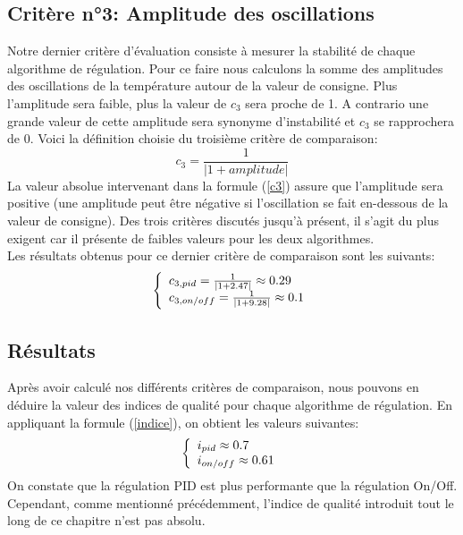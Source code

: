 \documentclass[12pt]{report}
\begin{document}
\subsection{Critère n°3: Amplitude des oscillations}
Notre dernier critère d'évaluation consiste à mesurer la stabilité de chaque algorithme de régulation. Pour ce faire nous calculons la somme des amplitudes des oscillations de la température autour de la valeur de consigne. Plus l'amplitude sera faible, plus la valeur de $c_3$ sera proche de 1. A contrario une grande valeur de cette amplitude sera synonyme d'instabilité et $c_3$ se rapprochera de 0. Voici la définition choisie du troisième critère de comparaison:\\
\begin{equation}
c_3 = \frac{1}{|1+ amplitude|}
\label{c3}
\end{equation}
\noindent
La valeur absolue intervenant dans la formule (\ref{c3}) assure que l'amplitude sera positive (une amplitude peut être négative si l'oscillation se fait en-dessous de la valeur de consigne). Des trois critères discutés jusqu'à présent, il s'agit du plus exigent car il présente de faibles valeurs pour les deux algorithmes.\\
\noindent
Les résultats obtenus pour ce dernier critère de comparaison sont les suivants:
\[\left\{ 
\begin{array}{l l}
c_{3, pid} = \frac{1}{|1+2.47|} \approx 0.29\\
c_{3, on/off} = \frac{1}{|1+9.28|} \approx 0.1\\ 
\end{array}
\right. \]

\subsection{Résultats}

Après avoir calculé nos différents critères de comparaison, nous pouvons en déduire la valeur des indices de qualité pour chaque algorithme de régulation. En appliquant la formule (\ref{indice}), on obtient les valeurs suivantes:
\[\left\{ 
\begin{array}{l l}
i_{pid} \approx 0.7\\
i_{on/off} \approx 0.61\\
\end{array}
\right. \]
On constate que la régulation PID est plus performante que la régulation On/Off. Cependant, comme mentionné précédemment, l'indice de qualité introduit tout le long de ce chapitre n'est pas absolu. 
\end{document}
